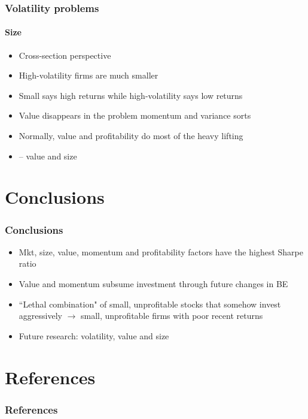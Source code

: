 \documentclass[notes]{beamer}  %
\begin{document}
\begin{frame} \frametitle{Volatility problems} \framesubtitle{Size}
  \begin{itemize}
    \item Cross-section perspective
    \item High-volatility firms are much smaller
    \item Small says high returns while high-volatility says low returns
    \item Value disappears in the problem momentum and variance sorts
    \item Normally, value and profitability do most of the heavy lifting
    \item \textcite{gerakos2017decomposing} -- value and size
  \end{itemize}
\end{frame}

\section{Conclusions}

\begin{frame} \frametitle{Conclusions}
  \begin{itemize}
    \item Mkt, size, value, momentum and profitability factors have the
    highest Sharpe ratio
    \item Value and momentum subsume investment through future changes in BE
    \item ``Lethal combination" of small, unprofitable stocks that somehow
    invest aggressively $\rightarrow$ small, unprofitable firms with poor
    recent returns
    \item Future research: volatility, value and size
  \end{itemize}
\end{frame}

\section{References}

\begin{frame}[allowframebreaks]
  \frametitle{References}
  \printbibliography
\end{frame}
\end{document}
